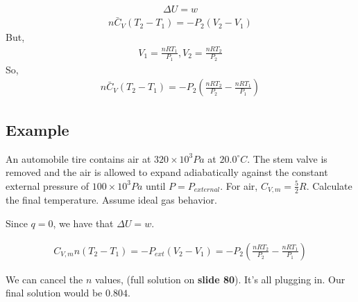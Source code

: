 \documentclass[12pt]{article}
\begin{document}
\begin{align*}
    \Delta U=w
\end{align*}
\begin{align*}
    n\bar{C}_V(T_2-T_1)=-P_2(V_2-V_1)
\end{align*}
But,
\begin{align*}
    V_1=\frac{nRT_1}{P_1}, V_2=\frac{nRT_2}{P_2}
\end{align*}
So,
\begin{align*}
    n\bar{C}_V(T_2-T_1)=-P_2(\frac{nRT_2}{P_2}-\frac{nRT_1}{P_1})
\end{align*}

\subsection*{Example}

An automobile tire contains air at $320\times10^3Pa$ at $20.0^{\circ}C$. The stem valve is
removed and the air is allowed to expand adiabatically against the constant
external pressure of $100\times10^3 Pa$ until $P=P_{external}$. For air, $C_{V,m}=\frac{5}{2}R$. Calculate
the final temperature. Assume ideal gas behavior.

Since $q=0$, we have that $\Delta U=w$.

\begin{align*}
    C_{V,m}n(T_2-T_1)=-P_{ext}(V_2-V_1)=-P_2(\frac{nRT_2}{P_2}-\frac{nRT_1}{P_1})
\end{align*}

We can cancel the $n$ values, (full solution on \textbf{slide 80}). It's all plugging in. Our final solution would be $0.804$.
\end{document}
